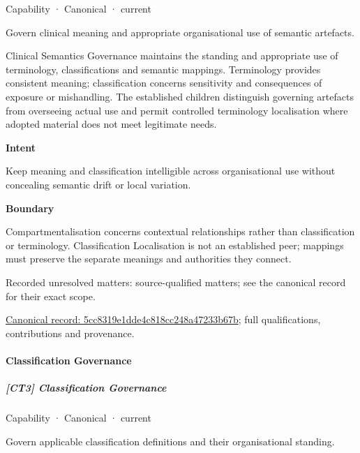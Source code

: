 \label{element:5cc8319e1dde4c818cc248a47233b67b}
{\small Capability · Canonical · current}\par

Govern clinical meaning and appropriate organisational use of semantic artefacts.



Clinical Semantics Governance maintains the standing and appropriate use of terminology, classifications and semantic mappings. Terminology provides consistent meaning; classification concerns sensitivity and consequences of exposure or mishandling. The established children distinguish governing artefacts from overseeing actual use and permit controlled terminology localisation where adopted material does not meet legitimate needs.



\textbf{Intent}



Keep meaning and classification intelligible across organisational use without concealing semantic drift or local variation.



\textbf{Boundary}



Compartmentalisation concerns contextual relationships rather than classification or terminology. Classification Localisation is not an established peer; mappings must preserve the separate meanings and authorities they connect.


{\small Recorded unresolved matters: source-qualified matters; see the canonical record for their exact scope.}\par
{\footnotesize \href{../../../../continuum/strategy/capability/5cc8319e1dde4c818cc248a47233b67b.md}{Canonical record: 5cc8319e1dde4c818cc248a47233b67b}; full qualifications, contributions and provenance.}\par
\paragraph{Classification Governance}

\subparagraph{[CT3] Classification Governance}

\label{element:4520ce37454e4de68580d75fdb08efe6}
{\small Capability · Canonical · current}\par

Govern applicable classification definitions and their organisational standing.



